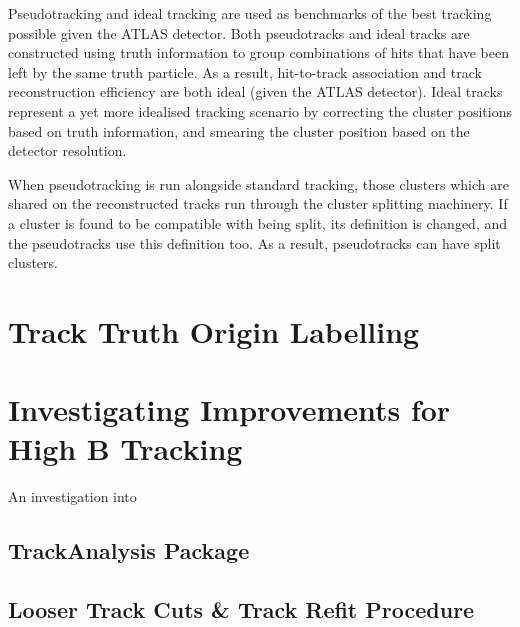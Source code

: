 Pseudotracking and ideal tracking are used as benchmarks of the best tracking possible given the ATLAS detector. Both pseudotracks and ideal tracks are constructed using truth information to group combinations of hits that have been left by the same truth particle. As a result, hit-to-track association and track reconstruction efficiency are both ideal (given the ATLAS detector). Ideal tracks represent a yet more idealised tracking scenario by correcting the cluster positions based on truth information, and smearing the cluster position based on the detector resolution.

When pseudotracking is run alongside standard tracking, those clusters which are shared on the reconstructed tracks run through the cluster splitting machinery. If a cluster is found to be compatible with being split, its definition is changed, and the pseudotracks use this definition too. As a result, pseudotracks can have split clusters.


\section{Track Truth Origin Labelling}\label{sec:track labelling}


\section{Investigating Improvements for High \texorpdfstring{\pT}{pT} B Tracking}\label{sec:investigating tracking improvements}

An investigation into

\subsection{TrackAnalysis Package}\label{sec:track analysis package}


\subsection{Looser Track Cuts \& Track Refit Procedure}\label{sec:bcut and refit}

